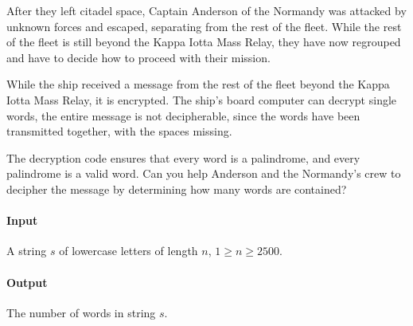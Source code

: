 



\makeheader

After they left citadel space, Captain Anderson of the Normandy was attacked by unknown forces and escaped, separating from the rest of the fleet. While the rest of the fleet is still beyond the Kappa Iotta Mass Relay, they have now regrouped and have to decide how to proceed with their mission.

While the ship received a message from the rest of the fleet beyond the Kappa Iotta Mass Relay, it is encrypted. The ship's board computer can decrypt single words, the entire message is not decipherable, since the words have been transmitted together, with the spaces missing.

The decryption code ensures that every word is a palindrome, and every palindrome is a valid word. Can you help Anderson and the Normandy's crew to decipher the message by determining how many words are contained?

\paragraph*{Input}

A string $s$ of lowercase letters of length $n$, $1 \geq n \geq 2500$.

\paragraph*{Output}

The number of words in string $s$.

\begin{samples}
\end{samples}

